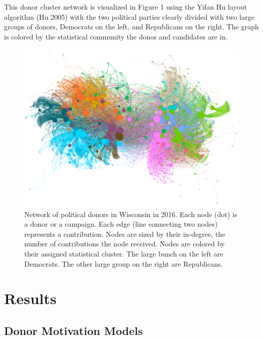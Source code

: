 \documentclass[12pt,]{article}
\begin{document}
This donor cluster network is visualized in Figure 1 using the Yifan Hu
layout algorithm (Hu 2005) with the two political parties clearly
divided with two large groups of donors, Democrats on the left, and
Republicans on the right. The graph is colored by the statistical
community the donor and candidates are in.

\begin{figure}
\centering
\includegraphics{../tables_and_figures/fig_1_white.png}
\caption{Network of political donors in Wisconsin in 2016. Each node
(dot) is a donor or a campaign. Each edge (line connecting two nodes)
represents a contribution. Nodes are sized by their in-degree, the
number of contributions the node received. Nodes are colored by their
assigned statistical cluster. The large bunch on the left are Democrats.
The other large group on the right are Republicans.}
\end{figure}

\hypertarget{results}{%
\section{Results}\label{results}}

\hypertarget{donor-motivation-models}{%
\subsection{Donor Motivation Models}\label{donor-motivation-models}}
\end{document}

